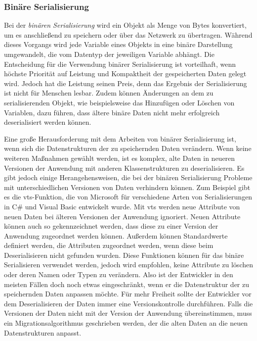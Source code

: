 \subsubsection{Binäre Serialisierung} \label{sssec:binSerialisierung}
Bei der \textit{binären Serialisierung} wird ein Objekt als Menge von Bytes konvertiert, um es anschließend zu speichern oder über das Netzwerk zu übertragen. Während dieses Vorgangs wird jede Variable eines Objekts in eine binäre Darstellung umgewandelt, die vom Datentyp der jeweiligen Variable abhängt. Die Entscheidung für die Verwendung binärer Serialisierung ist vorteilhaft, wenn höchste Priorität auf Leistung und Kompaktheit der gespeicherten Daten gelegt wird. Jedoch hat die Leistung seinen Preis, denn das Ergebnis der Serialisierung ist nicht für Menschen lesbar. Zudem können Änderungen an dem zu serialisierenden Objekt, wie beispielsweise das Hinzufügen oder Löschen von Variablen, dazu führen, dass ältere binäre Daten nicht mehr erfolgreich deserialisiert werden können.\cite{microsoftBinarySerialization}\cite{programmathicallyUnderstandingBinary}

Eine große Herausforderung mit dem Arbeiten von binärer Serialisierung ist, wenn sich die Datenstrukturen der zu speichernden Daten verändern. Wenn keine weiteren Maßnahmen gewählt werden, ist es komplex, alte Daten in neueren Versionen der Anwendung mit anderen Klassenstrukturen zu deserialisieren. Es gibt jedoch einige Herangehensweisen, die bei der binären Serialisierung Probleme mit unterschiedlichen Versionen von Daten verhindern können. Zum Beispiel gibt es die \ac{vts}-Funktion, die von Microsoft für verschiedene Arten von Serialisierungen in C\# und Visual Basic entwickelt wurde. Mit \ac{vts} werden neue Attribute von neuen Daten bei älteren Versionen der Anwendung ignoriert. Neuen Attribute können auch so gekennzeichnet werden, dass diese zu einer Version der Anwendung zugeordnet werden können. Außerdem können Standardwerte definiert werden, die Attributen zugeordnet werden, wenn diese beim Deserialisieren nicht gefunden wurden. Diese Funktionen können für das binäre Serialisieren verwendet werden, jedoch wird empfohlen, keine Attribute zu löschen oder deren Namen oder Typen zu verändern.\cite{microsoftVersiontolerantBinary} Also ist der Entwickler in den meisten Fällen doch noch etwas eingeschränkt, wenn er die Datenstruktur der zu speichernden Daten anpassen möchte. Für mehr Freiheit sollte der Entwickler vor dem Deserialisieren der Daten immer eine Versionskontrolle durchführen. Falls die Versionen der Daten nicht mit der Version der Anwendung übereinstimmen, muss ein Migrationsalgorithmus geschrieben werden, der die alten Daten an die neuen Datenstrukturen anpasst.


